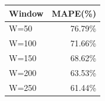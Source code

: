 {\tiny\setlength{\tabcolsep}{2pt}\begin{tabular}{lr} \toprule
Window & MAPE(\%) \\ \midrule
W=50 & 76.79\% \\ 
W=100 & 71.66\% \\ 
W=150 & 68.62\% \\ 
W=200 & 63.53\% \\ 
W=250 & 61.44\% \\ 
\bottomrule \end{tabular}}